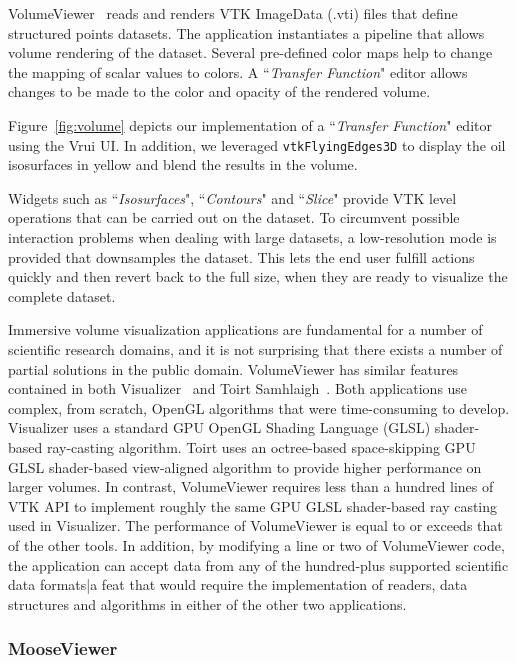 VolumeViewer~\cite{VolumeViewer} reads and renders VTK ImageData (.vti) files that define structured points datasets.  The application instantiates a pipeline that allows volume rendering of the dataset. Several pre-defined color maps help to change the mapping of scalar values to colors. A ``\textit{Transfer Function}" editor allows changes to be made to the color and opacity of the rendered volume.

Figure~\ref{fig:volume} depicts our implementation of a ``\textit{Transfer Function}" editor using the Vrui UI. In addition, we leveraged \texttt{vtkFlyingEdges3D} to display the oil isosurfaces in yellow and blend the results in the volume.

Widgets such as ``\textit{Isosurfaces}", ``\textit{Contours}" and ``\textit{Slice}" provide VTK level operations that can be carried out on the dataset. To circumvent possible interaction problems when dealing with large datasets, a low-resolution mode is provided that downsamples the dataset. This lets the end user fulfill actions quickly and then revert back to the full size, when they are ready to visualize the complete dataset.

Immersive volume visualization applications are fundamental for a number of scientific research domains, and it is not surprising that there exists a number of partial solutions in the public domain. VolumeViewer has similar features contained in both Visualizer~\cite{Billen:2008} and Toirt Samhlaigh~\cite{O'Leary:2008}. Both applications use complex, from scratch, OpenGL algorithms that were time-consuming to develop. Visualizer uses a standard GPU OpenGL Shading Language (GLSL) shader-based ray-casting algorithm. Toirt uses an octree-based space-skipping GPU GLSL shader-based view-aligned algorithm to provide higher performance on larger volumes. In contrast, VolumeViewer requires less than a hundred lines of VTK API to implement roughly the same GPU GLSL shader-based ray casting used in Visualizer. The performance of VolumeViewer is equal to or exceeds that of the other tools. In addition, by modifying a line or two of VolumeViewer code, the application can accept data from any of the hundred-plus supported scientific data formats|a feat that would require the implementation of readers, data structures and algorithms in either of the other two applications.

\subsubsection{MooseViewer}

